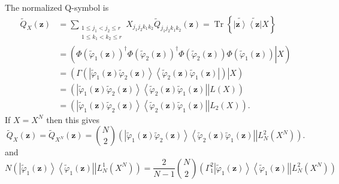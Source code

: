 \documentclass[aps,preprint]{revtex4}%
\begin{document}
The normalized Q-symbol is
\begin{align}
\tilde{Q}_{X}\left(  \mathbf{z}\right)   &  =\sum_{\substack{1\leq j_{1}%
<j_{2}\leq r\\1\leq k_{1}<k_{2}\leq r}}X_{j_{1}j_{2}k_{1}k_{2}}\tilde
{Q}_{j_{1}j_{2}k_{1}k_{2}}\left(  \mathbf{z}\right)  =\operatorname*{Tr}%
\left\{  \widetilde{\left\vert \mathbf{z}\right\rangle }%
\widetilde{\left\langle \mathbf{z}\right\vert }X\right\} \nonumber\\
&  =\left(  \left.  \Phi\left(  \tilde{\varphi}_{1}\left(  \mathbf{z}\right)
\right)  ^{\dagger}\Phi\left(  \tilde{\varphi}_{2}\left(  \mathbf{z}\right)
\right)  ^{\dagger}\Phi\left(  \tilde{\varphi}_{2}\left(  \mathbf{z}\right)
\right)  \Phi\left(  \tilde{\varphi}_{1}\left(  \mathbf{z}\right)  \right)
\right\vert X\right) \nonumber\\
&  =\left(  \left.  \Gamma\left(  \left\vert \tilde{\varphi}_{1}\left(
\mathbf{z}\right)  \tilde{\varphi}_{2}\left(  \mathbf{z}\right)  \right\rangle
\left\langle \tilde{\varphi}_{2}\left(  \mathbf{z}\right)  \tilde{\varphi}%
_{1}\left(  \mathbf{z}\right)  \right\vert \right)  \right\vert X\right)
\nonumber\\
&  =\left(  \left.  \left\vert \tilde{\varphi}_{1}\left(  \mathbf{z}\right)
\tilde{\varphi}_{2}\left(  \mathbf{z}\right)  \right\rangle \left\langle
\tilde{\varphi}_{2}\left(  \mathbf{z}\right)  \tilde{\varphi}_{1}\left(
\mathbf{z}\right)  \right\vert \right\vert L\left(  X\right)  \right)
\nonumber\\
&  =\left(  \left.  \left\vert \tilde{\varphi}_{1}\left(  \mathbf{z}\right)
\tilde{\varphi}_{2}\left(  \mathbf{z}\right)  \right\rangle \left\langle
\tilde{\varphi}_{2}\left(  \mathbf{z}\right)  \tilde{\varphi}_{1}\left(
\mathbf{z}\right)  \right\vert \right\vert L_{2}\left(  X\right)  \right)  .
\end{align}
If $X=X^{N}$ then this gives
\begin{equation}
\tilde{Q}_{X}\left(  \mathbf{z}\right)  =\tilde{Q}_{X^{N}}\left(
\mathbf{z}\right)  =\binom{N}{2}\left(  \left.  \left\vert \tilde{\varphi}%
_{1}\left(  \mathbf{z}\right)  \tilde{\varphi}_{2}\left(  \mathbf{z}\right)
\right\rangle \left\langle \tilde{\varphi}_{2}\left(  \mathbf{z}\right)
\tilde{\varphi}_{1}\left(  \mathbf{z}\right)  \right\vert \right\vert
L_{N}^{2}\left(  X^{N}\right)  \right)  .
\end{equation}
and
\begin{equation}
N\left(  \left.  \left\vert \tilde{\varphi}_{1}\left(  \mathbf{z}\right)
\right\rangle \left\langle \tilde{\varphi}_{1}\left(  \mathbf{z}\right)
\right\vert \right\vert L_{N}^{1}\left(  X^{N}\right)  \right)  =\frac{2}%
{N-1}\binom{N}{2}\left(  \left.  \Gamma_{1}^{2}\left\vert \tilde{\varphi}%
_{1}\left(  \mathbf{z}\right)  \right\rangle \left\langle \tilde{\varphi}%
_{1}\left(  \mathbf{z}\right)  \right\vert \right\vert L_{N}^{2}\left(
X^{N}\right)  \right)
\end{equation}
\end{document}
